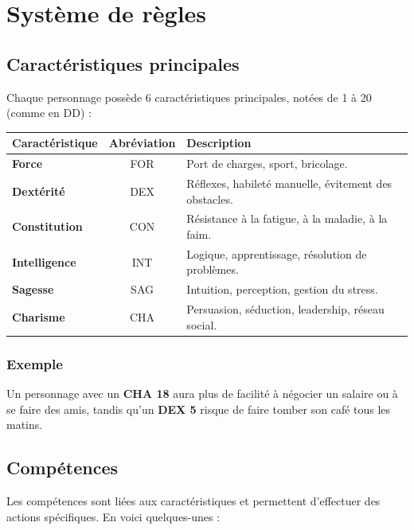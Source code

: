 \documentclass[11pt, a4paper]{article}
\begin{document}
\newpage
\section{Système de règles}

\subsection{Caractéristiques principales}
Chaque personnage possède 6 caractéristiques principales, notées de 1 à 20 (comme en DD) :

\begin{center}
    \begin{tabular}{>{\bfseries}lc p{8cm}}
        \toprule
        \textbf{Caractéristique} & \textbf{Abréviation} & \textbf{Description}	\\
        \midrule
        Force & FOR & Port de charges, sport, bricolage. 	\\
        Dextérité & DEX & Réflexes, habileté manuelle, évitement des obstacles. 	\\
        Constitution & CON & Résistance à la fatigue, à la maladie, à la faim. 	\\
        Intelligence & INT & Logique, apprentissage, résolution de problèmes. 	\\
        Sagesse & SAG & Intuition, perception, gestion du stress. 	\\
        Charisme & CHA & Persuasion, séduction, leadership, réseau social. 	\\
        \bottomrule
    \end{tabular}
\end{center}

\subsubsection{Exemple}
Un personnage avec un \textbf{CHA 18} aura plus de facilité à négocier un salaire ou à se faire des amis, tandis qu'un \textbf{DEX 5} risque de faire tomber son café tous les matins.

\subsection{Compétences}
Les compétences sont liées aux caractéristiques et permettent d'effectuer des actions spécifiques. En voici quelques-unes :
\end{document}
